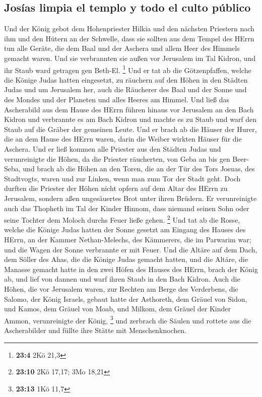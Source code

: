 \hypertarget{josuxedas-limpia-el-templo-y-todo-el-culto-puxfablico}{%
\subsection{Josías limpia el templo y todo el culto
público}\label{josuxedas-limpia-el-templo-y-todo-el-culto-puxfablico}}

 Und der König gebot dem Hohenpriester Hilkia und den
nächsten Priestern nach ihm und den Hütern an der Schwelle, dass sie
sollten aus dem Tempel des HErrn tun alle Geräte, die dem Baal und der
Aschera und allem Heer des Himmels gemacht waren. Und sie verbrannten
sie außen vor Jerusalem im Tal Kidron, und ihr Staub ward getragen gen
Beth-El. \footnote{\textbf{23:4} 2Kö 21,3}  Und er tat ab
die Götzenpfaffen, welche die Könige Judas hatten eingesetzt, zu
räuchern auf den Höhen in den Städten Judas und um Jerusalem her, auch
die Räucherer des Baal und der Sonne und des Mondes und der Planeten und
alles Heeres am Himmel.  Und ließ das Ascherabild aus dem
Hause des HErrn führen hinaus vor Jerusalem an den Bach Kidron und
verbrannte es am Bach Kidron und machte es zu Staub und warf den Staub
auf die Gräber der gemeinen Leute.  Und er brach ab die
Häuser der Hurer, die an dem Hause des HErrn waren, darin die Weiber
wirkten Häuser für die Aschera.  Und er ließ kommen alle
Priester aus den Städten Judas und verunreinigte die Höhen, da die
Priester räucherten, von Geba an bis gen Beer-Seba, und brach ab die
Höhen an den Toren, die an der Tür des Tors Josuas, des Stadtvogts,
waren und zur Linken, wenn man zum Tor der Stadt geht. 
Doch durften die Priester der Höhen nicht opfern auf dem Altar des HErrn
zu Jerusalem, sondern aßen ungesäuertes Brot unter ihren Brüdern.
 Er verunreinigte auch das Thopheth im Tal der Kinder
Hinnom, dass niemand seinen Sohn oder seine Tochter dem Moloch durchs
Feuer ließe gehen. \footnote{\textbf{23:10} 2Kö 17,17; 3Mo 18,21}
 Und tat ab die Rosse, welche die Könige Judas hatten der
Sonne gesetzt am Eingang des Hauses des HErrn, an der Kammer
Nethan-Melechs, des Kämmerers, die im Parwarim war; und die Wagen der
Sonne verbrannte er mit Feuer.  Und die Altäre auf dem
Dach, dem Söller des Ahas, die die Könige Judas gemacht hatten, und die
Altäre, die Manasse gemacht hatte in den zwei Höfen des Hauses des
HErrn, brach der König ab, und lief von dannen und warf ihren Staub in
den Bach Kidron.  Auch die Höhen, die vor Jerusalem
waren, zur Rechten am Berge des Verderbens, die Salomo, der König
Israels, gebaut hatte der Asthoreth, dem Gräuel von Sidon, und Kamos,
dem Gräuel von Moab, und Milkom, dem Gräuel der Kinder Ammon,
verunreinigte der König, \footnote{\textbf{23:13} 1Kö 11,7}
 und zerbrach die Säulen und rottete aus die
Ascherabilder und füllte ihre Stätte mit Menschenknochen.

